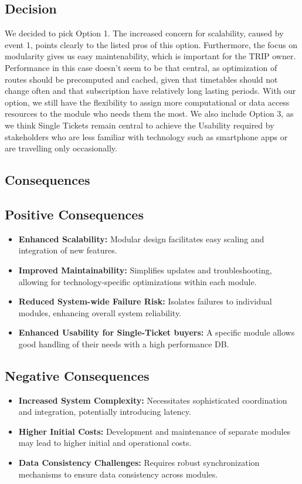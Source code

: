 \subsection*{Decision}
We decided to pick Option 1. The increased concern for scalability, caused by event 1, points clearly to the listed pros of this option. Furthermore, the focus on modularity
gives us easy maintenability, which is important for the TRIP owner.
Performance in this case doesn't seem to be that central, as optimization of routes should be precomputed and cached, given that timetables should not change often and that subscription have relatively long lasting periods.
With our option, we still have the flexibility to assign more computational or data access resources to the module who needs them the most.
We also include Option 3, as we think Single Tickets remain central to achieve the Usability required by stakeholders who are less familiar with technology such as smartphone apps or are travelling only occasionally.

\subsection*{Consequences}
\subsection*{Positive Consequences}

\begin{itemize}[noitemsep]
    \item \textbf{Enhanced Scalability:} Modular design facilitates easy scaling and integration of new features.
    \item \textbf{Improved Maintainability:} Simplifies updates and troubleshooting, allowing for technology-specific optimizations within each module.
    \item \textbf{Reduced System-wide Failure Risk:} Isolates failures to individual modules, enhancing overall system reliability.
    \item \textbf{Enhanced Usability for Single-Ticket buyers:} A specific module allows good handling of their needs with a high performance DB.
\end{itemize}

\subsection*{Negative Consequences}

\begin{itemize}[noitemsep]
    \item \textbf{Increased System Complexity:} Necessitates sophisticated coordination and integration, potentially introducing latency.
    \item \textbf{Higher Initial Costs:} Development and maintenance of separate modules may lead to higher initial and operational costs.
    \item \textbf{Data Consistency Challenges:} Requires robust synchronization mechanisms to ensure data consistency across modules.
\end{itemize}

